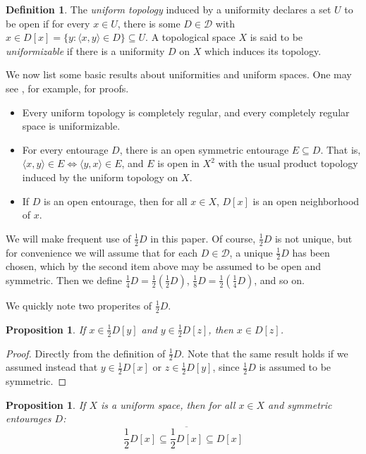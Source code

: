 \documentclass{amsart}
\newtheorem{prop}[thm]{Proposition}
\theoremstyle{definition}
\newtheorem{defn}[thm]{Definition}
\theoremstyle{remark}
\newcommand{\mc}{\mathcal}
\newcommand{\<}{\langle}
\renewcommand{\>}{\rangle}
\newcommand{\cl}[1]{\overline{#1}}
\newcommand{\term}{\textit}
\begin{document}
\begin{defn}
  The \term{uniform topology} induced by a uniformity declares a set $U$ to be open if for every $x\in U$, there is some $D\in\mc D$ with $x\in D[x]=\{y: \<x,y\>\in D\}\subseteq U$.   A topological space $X$ is said to be \term{uniformizable} if there is a uniformity $D$ on $X$ which induces its topology.
\end{defn}

We now list some basic results about uniformities and uniform spaces.  One may see \cite{e}, for example, for proofs.



\begin{itemize}
 \item Every uniform topology is completely regular, and every completely regular space is uniformizable.
\item  For every entourage $D$, there is an open symmetric entourage $E\subseteq D$. That is, $\<x,y\>\in E \Leftrightarrow \<y,x\> \in E$, and $E$ is open in $X^2$ with the usual product topology induced by the uniform topology on $X$.
\item  If $D$ is an open entourage, then for all $x\in X$, $D[x]$ is an open neighborhood of $x$.
\end{itemize}

We will make frequent use of $\frac{1}{2}D$ in this paper.  Of course, $\frac{1}{2}D$ is not unique, but for convenience we will assume that for each $D\in \mathcal D$, a unique $\frac{1}{2}D$ has been chosen, which  by the second item above may be assumed to be open and symmetric.  Then we define $\frac{1}{4}D=\frac{1}{2}(\frac{1}{2}D)$,
$\frac{1}{8}D=\frac{1}{2}(\frac{1}{4}D)$, and so on.

We quickly note two properites of $\frac{1}{2}D$.

\begin{prop}
  If $x\in \frac{1}{2}D[y]$ and $y\in \frac{1}{2}D[z]$, then $x\in D[z]$.
\end{prop}

\begin{proof}
  Directly from the definition of $\frac{1}{2}D$. Note that the same result holds if we assumed instead that $y\in \frac{1}{2}D[x]$ or $z\in \frac{1}{2}D[y]$, since $\frac{1}{2}D$ is assumed to be symmetric.
\end{proof}

\begin{prop}
  If $X$ is a uniform space, then for all $x\in X$ and symmetric entourages $D$:
    \[
      \frac{1}{2}D[x]\subseteq \cl{\frac{1}{2}D[x]}\subseteq D[x]
    \]
\end{prop}
\end{document}
